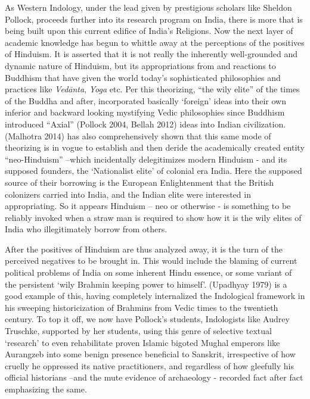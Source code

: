 As Western Indology, under the lead given by prestigious scholars like Sheldon Pollock, proceeds further into its research program on India, there is more that is being built upon this current edifice of India’s Religions. Now the next layer of academic knowledge has begun to whittle away at the perceptions of the positives of Hinduism. It is asserted that it is not really the inherently well-grounded and dynamic nature of Hinduism, but its appropriations from and reactions to Buddhism that have given the world today’s sophisticated philosophies and practices like \textit{Vedānta}, \textit{Yoga} etc. Per this theorizing, “the wily elite” of the times of the Buddha and after, incorporated basically ‘foreign’ ideas into their own inferior and backward looking mystifying Vedic philosophies since Buddhism introduced “Axial” (Pollock 2004, Bellah 2012) ideas into Indian civilization. (Malhotra 2014) has also comprehensively shown that this same mode of theorizing is in vogue to establish and then deride the academically created entity “neo-Hinduism” –which incidentally delegitimizes modern Hinduism - and its supposed founders, the ‘Nationalist elite’ of colonial era India. Here the supposed source of their borrowing is the European Enlightenment that the British colonizers carried into India, and the Indian elite were interested in appropriating. So it appears Hinduism – neo or otherwise - is something to be reliably invoked when a straw man is required to show how it is the wily elites of India who illegitimately borrow from others.

\newpage

After the positives of Hinduism are thus analyzed away, it is the turn of the perceived negatives to be brought in. This would include the blaming of current political problems of India on some inherent Hindu essence, or some variant of the persistent ‘wily Brahmin keeping power to himself’. (Upadhyay 1979) is a good example of this, having completely internalized the Indological framework in his sweeping historicization of Brahmins from Vedic times to the twentieth century. To top it off, we now have Pollock’s students, Indologists like Audrey Truschke, supported by her students, using this genre of selective textual ‘research’ to even rehabilitate proven Islamic bigoted Mughal emperors like Aurangzeb into some benign presence beneficial to Sanskrit, irrespective of how cruelly he oppressed its native practitioners, and regardless of how gleefully his official historians –and the mute evidence of archaeology - recorded fact after fact emphasizing the same.


